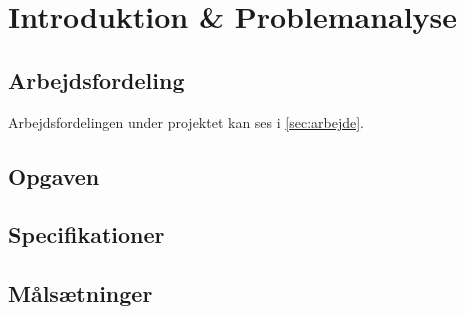 \section{Introduktion \& Problemanalyse}
\subsection{Arbejdsfordeling}
Arbejdsfordelingen under projektet kan ses i \cref{sec:arbejde}.
\subsection{Opgaven}
\subsection{Specifikationer}
\subsection{Målsætninger}